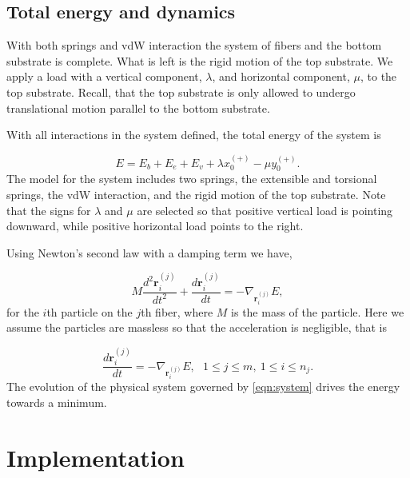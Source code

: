 
\subsection{Total energy and dynamics}

With both springs and vdW interaction the system of fibers and the bottom substrate is complete. What is left is the rigid motion of the top substrate. We apply a load with a vertical component, $\lambda$, and horizontal component, $\mu$, to the top substrate. Recall, that the top substrate is only allowed to undergo translational motion parallel to the bottom substrate.

With all interactions in the system defined, the total energy of the system is

\begin{equation}
	E = E_b + E_e + E_v + \lambda x_0^{(+)} - \mu y_0^{(+)}.
\end{equation}
The model for the system includes two springs, the extensible and torsional springs, the vdW interaction, and the rigid motion of the top substrate. Note that the signs for $\lambda$ and $\mu$ are selected so that positive vertical load is pointing downward, while positive horizontal load points to the right.

Using Newton's second law with a damping term we have,

\begin{equation}
	M\frac{d^2\textbf{r}_i^{(j)}}{dt^2} + \frac{d\textbf{r}_i^{(j)}}{dt} = -\nabla_{\textbf{r}_i^{(j)}}E,
\end{equation}
for the $i$th particle on the $j$th fiber, where $M$ is the mass of the particle. Here we assume the particles are massless so that the acceleration is negligible, that is

\begin{equation} \label{eqn:system}
	 \frac{d\textbf{r}_i^{(j)}}{dt} = -\nabla_{\textbf{r}_i^{(j)}}E,\ \ \ 1 \leq j \leq m,\  1 \leq i \leq n_j.
\end{equation}
The evolution of the physical system governed by \eqref{eqn:system} drives the energy towards a minimum.

\section{Implementation}

